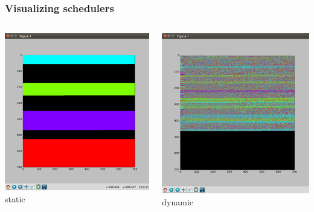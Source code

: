 \documentclass[12pt,dvipdfmx]{beamer}
\begin{document}
\begin{frame}
\frametitle{Visualizing schedulers}
\begin{columns}
\begin{column}{0.5\textwidth}
\includegraphics[width=\textwidth]{out/pdf/img/load_balance_static.pdf}
\vskip-2mm
{\footnotesize static}
\end{column}

\begin{column}{0.5\textwidth}
\includegraphics[width=\textwidth]{out/pdf/img/load_balance_dynamic.pdf}
\vskip-2mm
{\footnotesize dynamic}
\end{column}
\end{columns}
\end{frame}
\end{document}
